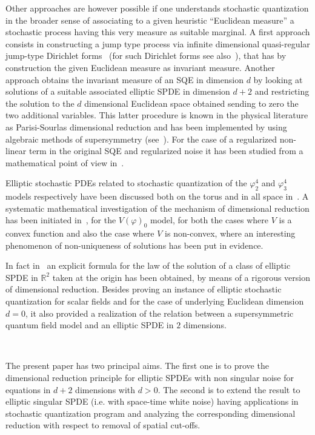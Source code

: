 \documentclass[a4paper,10pt]{article}
\begin{document}
Other approaches are however possible if one understands stochastic
quantization in the broader sense of associating to a given heuristic
``Euclidean measure'' a stochastic process having this very measure as
suitable marginal. A first approach consists in constructing a jump type
process via infinite dimensional quasi-regular jump-type Dirichlet
forms~{\cite{Yoshida,Albeverio2002,Yoshida2008,Yoshida2010}} (for such
Dirichlet forms see also~{\cite{ARu,AFeHKL}}), that has by construction the
given Euclidean measure as invariant measure. Another approach obtains the
invariant measure of an SQE in dimension $d$ by looking at solutions of a
suitable associated elliptic SPDE in dimension $d + 2$ and restricting the
solution to the $d$ dimensional Euclidean space obtained sending to zero the
two additional variables. This latter procedure is known in the physical
literature as Parisi-Sourlas dimensional reduction and has been implemented by
using algebraic methods of supersymmetry (see~{\cite{parisi_random_1979}}).
For the case of a regularized non-linear term in the original SQE and
regularized noise it has been studied from a mathematical point of view
in~{\cite{Klein1984}}.

Elliptic stochastic PDEs related to stochastic quantization of the
$\varphi_2^4$ and $\varphi_3^4$ models respectively have been discussed both
on the torus and in all space in~{\cite{GH18}}. A systematic mathematical
investigation of the mechanism of dimensional reduction has been initiated
in~{\cite{Albeverio2018elliptic}}, for the $V (\varphi)_0$ model, for both the
cases where $V$ is a convex function and also the case where $V$ is
non-convex, where an interesting phenomenon of non-uniqueness of solutions has
been put in evidence.

In fact in~{\cite{Albeverio2018elliptic}} an explicit formula for the law of
the solution of a class of elliptic SPDE in $\mathbb{R}^2$ taken at the origin
has been obtained, by means of a rigorous version of dimensional reduction.
Besides proving an instance of elliptic stochastic quantization for scalar
fields and for the case of underlying Euclidean dimension $d = 0$, it also
provided a realization of the relation between a supersymmetric quantum field
model and an elliptic SPDE in $2$ dimensions.

\

The present paper has two principal aims. The first one is to prove the
dimensional reduction principle for elliptic SPDEs with non singular noise for
equations in $d + 2$ dimensions with $d > 0$. The second is to extend the
result to elliptic singular SPDE (i.e. with space-time white noise) having
applications in stochastic quantization program and analyzing the
corresponding dimensional reduction with respect to removal of spatial
cut-offs.
\end{document}
